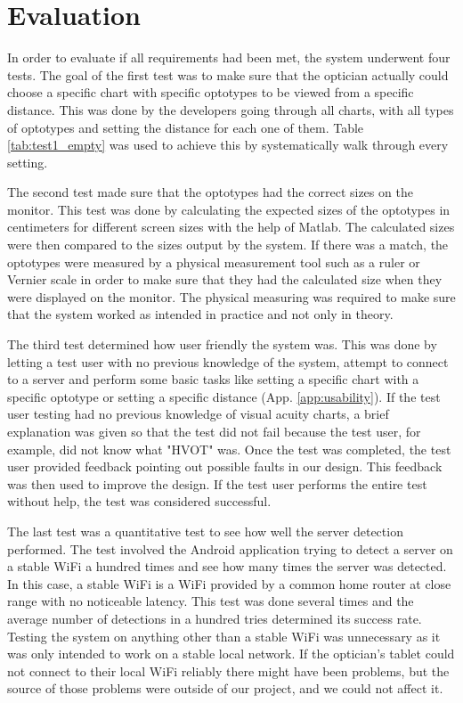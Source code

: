 \documentclass[12pt,a4paper,notitlepage]{report}
\begin{document}
\section{Evaluation \label{sec:evaluation}}
In order to evaluate if all requirements had been met, the system underwent four tests. The goal of the first test was to make sure that the optician actually could choose a specific chart with specific optotypes to be viewed from a specific distance. This was done by the developers going through all charts, with all types of optotypes and setting the distance for each one of them. Table \ref{tab:test1_empty} was used to achieve this by systematically walk through every setting.

The second test made sure that the optotypes had the correct sizes on the monitor. This test was done by calculating the expected sizes of the optotypes in centimeters for different screen sizes with the help of Matlab. The calculated sizes were then compared to the sizes output by the system. If there was a match, the optotypes were measured by a physical measurement tool such as a ruler or Vernier scale in order to make sure that they had the calculated size when they were displayed on the monitor. The physical measuring was required to make sure that the system worked as intended in practice and not only in theory.

The third test determined how user friendly the system was. This was done by letting a test user with no previous knowledge of the system, attempt to connect to a server and perform some basic tasks like setting a specific chart with a specific optotype or setting a specific distance (App. \ref{app:usability}). If the test user testing had no previous knowledge of visual acuity charts, a brief explanation was given so that the test did not fail because the test user, for example, did not know what "HVOT" was. Once the test was completed, the test user provided feedback pointing out possible faults in our design. This feedback was then used to improve the design. If the test user performs the entire test without help, the test was considered successful.

The last test was a quantitative test to see how well the server detection performed. The test involved the Android application trying to detect a server on a stable WiFi a hundred times and see how many times the server was detected. In this case, a stable WiFi is a WiFi provided by a common home router at close range with no noticeable latency. This test was done several times and the average number of detections in a hundred tries determined its success rate. Testing the system on anything other than a stable WiFi was unnecessary as it was only intended to work on a stable local network. If the optician's tablet could not connect to their local WiFi reliably there might have been problems, but the source of those problems were outside of our project, and we could not affect it.
\end{document}
